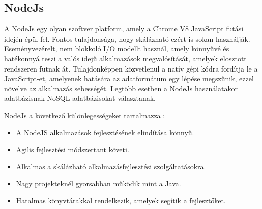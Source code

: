 \subsection{NodeJs}
A NodeJs \cite{js2016node} egy olyan szoftver platform, amely a Chrome V8 JavaScript futási idején épül fel. Fontos tulajdonsága, hogy skálázható ezért is sokan használják. Eseményvezérelt, nem blokkoló I/O modellt használ, amely könnyűvé és hatékonnyá teszi a valós idejű alkalmazások megvalósítását, amelyek elosztott rendszeren futnak át. Tulajdonképpen közvetlenül a natív gépi kódra fordítja le a JavaScript-et, amelyenek hatására az adatformátum egy lépése megszűnik, ezzel növelve az alkalmazás sebességét. Legtöbb esetben a NodeJs használatakor adatbázisnak NoSQL adatbázisokat választanak.

NodeJs a következő különlegességeket tartalmazza \cite{nodejsspring}:
\begin{itemize}
	\item A NodeJS alkalmazások fejlesztésének elindítása könnyű.
	\item Agilis fejlesztési módszertant követi.
	\item Alkalmas a skálázható alkalmazásfejlesztési szolgáltatásokra.
	\item Nagy projekteknél gyorsabban működik mint a Java.
	\item Hatalmas könyvtárakkal rendelkezik, amelyek segítik a fejlesztőket.
\end{itemize}
	
